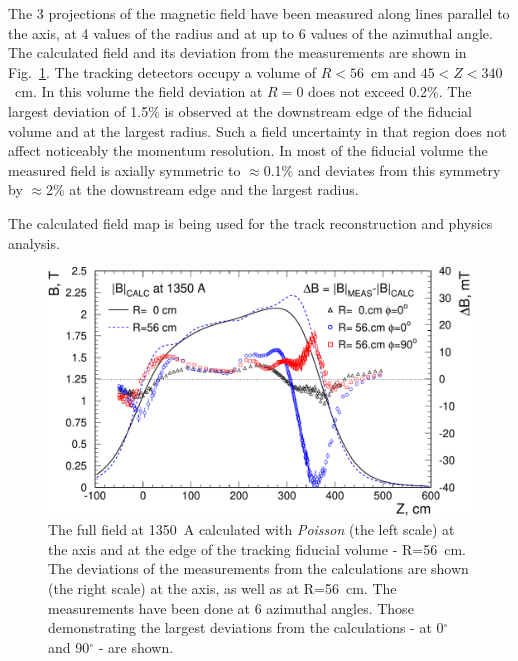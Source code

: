 The 3 projections of the magnetic field have been measured along lines
parallel to the axis, at 4 values of the radius and at up to 6 values
of the azimuthal angle. The calculated field and its deviation from
the measurements are shown in Fig.~\ref{fig:sol:field_comparison}. The
tracking detectors occupy a volume of $R<56$~cm and $45<Z<340$~cm. In
this volume the field deviation at $R=0$ does not exceed 0.2\%. The
largest deviation of 1.5\% is observed at the downstream edge of the
fiducial volume and at the largest radius. Such a field uncertainty in
that region does not affect noticeably the momentum resolution. In
most of the fiducial volume the measured field is axially symmetric to
$\approx$0.1\% and deviates from this symmetry by $\approx$2\% at the
downstream edge and the largest radius.

The calculated field map is being used for the track reconstruction and
physics analysis.
   

\begin{figure}[!htb]
  \begin{center}
     \includegraphics[angle=0,width=1.0\linewidth]{figures/solenoid_field_calc-meas_comparison_7_1_01}%
  \end{center}
  \caption{
    The full field at 1350~A calculated with {\it Poisson} (the left
    scale) at the axis and at the edge of the tracking fiducial volume
    - R=56~cm. The deviations of the measurements from the
    calculations are shown (the right scale) at the axis, as well as
    at R=56~cm. The measurements have been done at 6 azimuthal
    angles. Those demonstrating the largest deviations from the
    calculations - at 0$^\circ$ and 90$^\circ$ - are shown.  
    \label{fig:sol:field_comparison}
  }
\end{figure}


